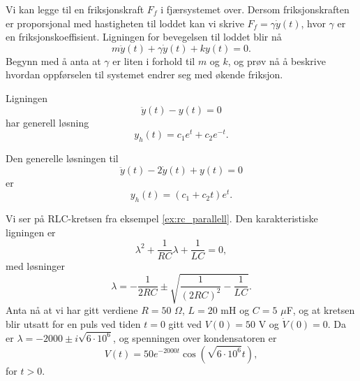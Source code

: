 \documentclass{article}
\theoremstyle{definition}
\theoremstyle{remark}
\newenvironment{ex}
{\pushQED{\qed}\renewcommand{\qedsymbol}{$\triangle$}\exx}
{\popQED\endexx}
\begin{document}
\begin{multicols*}{2}
\begin{ex}
  Vi kan legge til en friksjonskraft $F_f$ i fjærsystemet over. Dersom friksjonskraften er proporsjonal med hastigheten til loddet kan vi skrive $F_f = \gamma \dot{y}(t)$, hvor $\gamma$ er en friksjonskoeffisient. Ligningen for bevegelsen til loddet blir nå
  \begin{equation*}
    m \ddot{y}(t) + \gamma \dot{y}(t) + ky(t) = 0.
  \end{equation*}
  Begynn med å anta at $\gamma$ er liten i forhold til $m$ og $k$, og prøv nå å beskrive hvordan oppførselen til systemet endrer seg med økende friksjon.
\end{ex}

\begin{ex}
  Ligningen
  \begin{equation*}
    \ddot{y}(t) - y(t) = 0
  \end{equation*}
  har generell løsning
  \begin{equation*}
    y_h(t) = c_1 e^{t} + c_2 e^{-t}.
  \end{equation*}
\end{ex}

\begin{ex}
  Den generelle løsningen til
  \begin{equation*}
    \ddot{y}(t) - 2 \dot{y}(t) + y(t) = 0
  \end{equation*}
  er
  \begin{equation*}
    y_h(t) = (c_1 + c_2 t) e^t.
  \end{equation*}
\end{ex}

\begin{ex}
  Vi ser på RLC-kretsen fra eksempel \ref{ex:rc_parallell}. Den karakteristiske ligningen er
  \begin{equation*}
    \lambda^2 + \frac{1}{RC} \lambda + \frac{1}{LC} = 0,
  \end{equation*}
  med løsninger
  \begin{equation*}
    \lambda = - \frac{1}{2 R C} \pm \sqrt{\frac{1}{(2 R C)^2} - \frac{1}{LC}}.
  \end{equation*}
  Anta nå at vi har gitt verdiene $R = 50$ $\Omega$, $L = 20 $ mH og $C = 5$ $\mu$F, og at kretsen blir utsatt for en puls ved tiden $t = 0$ gitt ved $V(0) = 50$ V og $\dot{V}(0) = 0$. Da er $\lambda = -2000 \pm i \sqrt{6 \cdot 10^6}$, og spenningen over kondensatoren er
  \begin{equation*}
    V(t) = 50 e^{- 2000 t} \cos(\sqrt{6 \cdot 10^6} t),
  \end{equation*}
  for $t > 0$.
\end{ex}


\end{multicols*}
\end{document}
